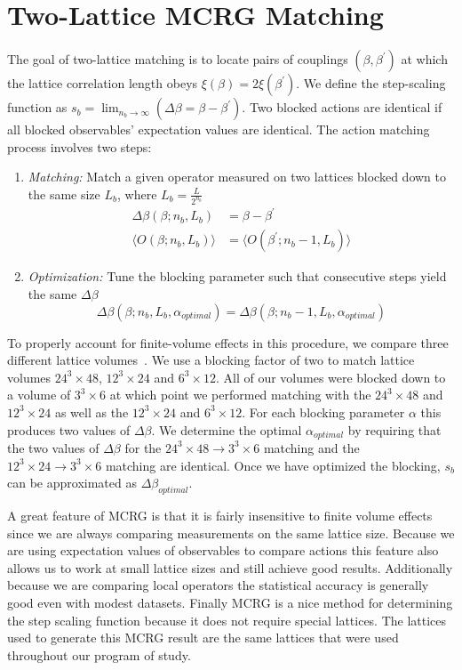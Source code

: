 \documentclass{PoS}
\newcommand{\X}{\ensuremath{\!\times\!} }
\begin{document}
\section{\label{sec:MCRG}Two-Lattice MCRG Matching}
The goal of two-lattice matching is to locate pairs of couplings $(\beta, \beta^{\prime})$ at which the lattice correlation length obeys $\xi(\beta)=2\xi(\beta^{\prime})$.
We define the step-scaling function as $s_b = \lim_{n_b\to\infty}(\Delta\beta=\beta - \beta^{\prime})$.
Two blocked actions are identical if all blocked observables' expectation values are identical.
The action matching process involves two steps:
\begin{enumerate}
  \item \emph{Matching:} Match a given operator measured on two lattices blocked down to the same size $L_b$, where $L_b=\frac{L}{2^{n_b}}$
  \begin{align}
    \Delta\beta(\beta;n_b,L_b) & = \beta-\beta^{\prime} \\
    \langle O(\beta;n_b,L_b)\rangle & = \langle O(\beta^{\prime};n_b-1,L_b)\rangle
  \end{align}
  \item \emph{Optimization:} Tune the blocking parameter such that consecutive steps yield the same $\Delta\beta$
  \begin{equation}
    \Delta\beta(\beta;n_b,L_b,\alpha_{optimal})=\Delta\beta(\beta;n_b-1,L_b,\alpha_{optimal})
  \end{equation}
\end{enumerate}

To properly account for finite-volume effects in this procedure, we compare three different lattice volumes~\cite{Hasenfratz:2011xn}.
We use a blocking factor of two to match lattice volumes $24^3\X48$, $12^3\X24$ and $6^3\X12$.
All of our volumes were blocked down to a volume of $3^3\X6$ at which point we performed matching with the $24^3\X48$ and $12^3\X24$ as well as the $12^3\X24$ and $6^3\X12$.
For each blocking parameter $\alpha$ this produces two values of $\Delta\beta$.
We determine the optimal $\alpha_{optimal}$ by requiring that the two values of $\Delta\beta$ for the $24^3\X48 \to 3^3\X6$ matching and the $12^3\X24 \to 3^3\X6$ matching are identical.
Once we have optimized the blocking, $s_b$ can be approximated as $\Delta\beta_{optimal}$.

A great feature of MCRG is that it is fairly insensitive to finite volume effects since we are always comparing measurements on the same lattice size.
Because we are using expectation values of observables to compare actions this feature also allows us to work at small lattice sizes and still achieve good results.
Additionally because we are comparing local operators the statistical accuracy is generally good even with modest datasets.
Finally MCRG is a nice method for determining the step scaling function because it does not require special lattices.
The lattices used to generate this MCRG result are the same lattices that were used throughout our program of study.
\end{document}
